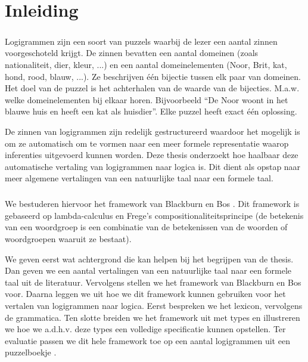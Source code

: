 \chapter{Inleiding}
\paragraph{} Logigrammen zijn een soort van puzzels waarbij de lezer een aantal zinnen voorgeschoteld krijgt. De zinnen bevatten een aantal domeinen (zoals nationaliteit, dier, kleur, ...) en een aantal domeinelementen (Noor, Brit, kat, hond, rood, blauw, ...). Ze beschrijven één bijectie tussen elk paar van domeinen. Het doel van de puzzel is het achterhalen van de waarde van de bijecties. M.a.w. welke domeinelementen bij elkaar horen. Bijvoorbeeld ``De Noor woont in het blauwe huis en heeft een kat als huisdier''. Elke puzzel heeft exact één oplossing.

De zinnen van logigrammen zijn redelijk gestructureerd waardoor het mogelijk is om ze automatisch om te vormen naar een meer formele representatie waarop inferenties uitgevoerd kunnen worden. Deze thesis onderzoekt hoe haalbaar deze automatische vertaling van logigrammen naar logica is. Dit dient als opstap naar meer algemene vertalingen van een natuurlijke taal naar een formele taal.

\paragraph{} We bestuderen hiervoor het framework van Blackburn en Bos \cite{Blackburn2005, Blackburn2006}. Dit framework is gebaseerd op lambda-calculus en Frege's compositionaliteitsprincipe (de betekenis van een woordgroep is een combinatie van de betekenissen van de woorden of woordgroepen waaruit ze bestaat).

We geven eerst wat achtergrond die kan helpen bij het begrijpen van de thesis. Dan geven we een aantal vertalingen van een natuurlijke taal naar een formele taal uit de literatuur. Vervolgens stellen we het framework van Blackburn en Bos voor. Daarna leggen we uit hoe we dit framework kunnen gebruiken voor het vertalen van logigrammen naar logica. Eerst bespreken we het lexicon, vervolgens de grammatica. Ten slotte breiden we het framework uit met types en illustreren we hoe we a.d.h.v. deze types een volledige specificatie kunnen opstellen. Ter evaluatie passen we dit hele framework toe op een aantal logigrammen uit een puzzelboekje \cite{logigrammen}.

